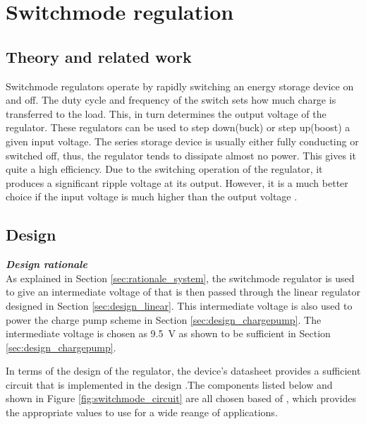 \chapter{Switchmode regulation}
\section{Theory and related work} \label{sec:literature_switchmode}

Switchmode regulators operate by rapidly switching an energy storage device on and off. The duty cycle and frequency of the switch sets how much charge is transferred to the load. This, in turn determines the output voltage of the regulator. These regulators can be used to step down(buck) or step up(boost) a given input voltage. The series storage device is usually either fully conducting or switched off, thus, the regulator tends to dissipate almost no power. This gives it quite a high efficiency. Due to the switching operation of the regulator, it produces a significant ripple voltage at its output. However, it is a much better choice if the input voltage is much higher than the output voltage \cite{regulators-main}.


\section{Design} \label{sec:design_switchmode}
\textbf{\textit{Design rationale}} \\
As explained in Section \ref{sec:rationale_system}, the switchmode regulator is used to give an intermediate voltage of that is then passed through the linear regulator designed in Section \ref{sec:design_linear}. This intermediate voltage is also used to power the charge pump scheme in Section \ref{sec:design_chargepump}. The intermediate voltage is chosen as \SI{9.5}{\volt} as shown to be sufficient in Section \ref{sec:design_chargepump}.

In terms of the design of the regulator, the device's datasheet provides a sufficient circuit that is implemented in the design \cite{LM2595}.The components listed below and shown in Figure \ref{fig:switchmode_circuit} are all chosen based of \cite{LM2595}, which provides the appropriate values to use for a wide reange of applications.

